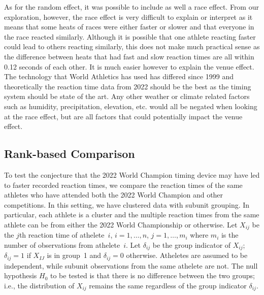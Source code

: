 \documentclass[12pt, letterpaper, titlepage]{article}
\begin{document}
As for the random effect, it was possible to include as well a race effect.
From our exploration, however, the race effect is very
difficult to explain or interpret as it means that some heats of races were either
faster or slower and that everyone in the race reacted similarly.  Although
it is possible that one athlete reacting faster could lead to others reacting
similarly, this does not make much practical sense as the difference between
heats that had fast and slow reaction times are all within 0.12 seconds of each
other.  It is much easier however to explain the venue effect.  The technology
that World Athletics has used has differed since 1999 and theoretically the
reaction time data from 2022 should be the best as the timing system should be
state of the art.  Any other weather or climate related factors such as humidity,
precipitation, elevation, etc. would all be negated when looking at the race
effect, but are all factors that could potentially impact the venue effect.


\subsection{Rank-based Comparison}


To test the conjecture that the 2022 World Champion timing device may have led
to faster recorded reaction times, we compare the reaction times of the same
athletes who have attended both the 2022 World Champion and other competitions.
In this setting, we have clustered data with subunit grouping. In particular,
each athlete is a cluster and the multiple reaction times from the same athlete
can be from either the 2022 World Championship or otherwise.
Let $X_{ij}$ be the $j$th reaction time of athelete~$i$, $i = 1, \ldots, n$,
$j = 1, \ldots, m_i$ where $m_i$ is the number of observations from
athelete~$i$. Let $\delta_{ij}$ be the group indicator of $X_{ij}$; $\delta_{ij}
= 1$ if $X_{IJ}$ is in group~1 and $\delta_{ij} = 0$ otherwise. Atheletes are
assumed to be independent, while subunit observations from the same athelete are
not. The null hypothesis $H_0$ to be tested is that there is no difference
between the two groups; i.e., the distribution of $X_{ij}$ remains the same
regardless of the group indicator $\delta_{ij}$.
\end{document}
